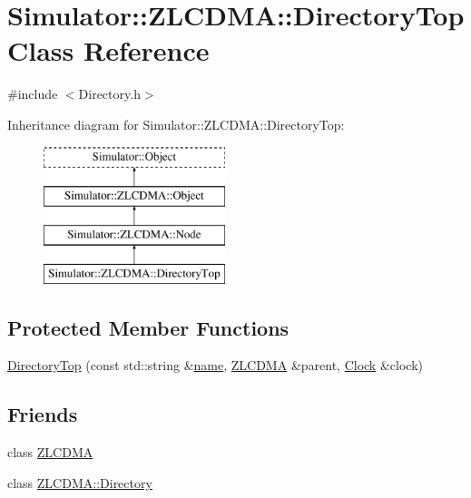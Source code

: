 \hypertarget{class_simulator_1_1_z_l_c_d_m_a_1_1_directory_top}{\section{Simulator\+:\+:Z\+L\+C\+D\+M\+A\+:\+:Directory\+Top Class Reference}
\label{class_simulator_1_1_z_l_c_d_m_a_1_1_directory_top}
}


{\ttfamily \#include $<$Directory.\+h$>$}

Inheritance diagram for Simulator\+:\+:Z\+L\+C\+D\+M\+A\+:\+:Directory\+Top\+:\begin{figure}[H]
\begin{center}
\leavevmode
\includegraphics[height=4.000000cm]{class_simulator_1_1_z_l_c_d_m_a_1_1_directory_top}
\end{center}
\end{figure}
\subsection*{Protected Member Functions}
\begin{DoxyCompactItemize}
\item 
\hyperlink{class_simulator_1_1_z_l_c_d_m_a_1_1_directory_top_af8fdc000b2e75afce37ee92b3893063a}{Directory\+Top} (const std\+::string \&\hyperlink{mtconf_8c_a8f8f80d37794cde9472343e4487ba3eb}{name}, \hyperlink{class_simulator_1_1_z_l_c_d_m_a}{Z\+L\+C\+D\+M\+A} \&parent, \hyperlink{class_simulator_1_1_clock}{Clock} \&clock)
\end{DoxyCompactItemize}
\subsection*{Friends}
\begin{DoxyCompactItemize}
\item 
class \hyperlink{class_simulator_1_1_z_l_c_d_m_a_1_1_directory_top_a1c09861c9a70825235b5f80518d478a1}{Z\+L\+C\+D\+M\+A}
\item 
class \hyperlink{class_simulator_1_1_z_l_c_d_m_a_1_1_directory_top_a1c8d2b869e248d4ee4a7b637c7252d62}{Z\+L\+C\+D\+M\+A\+::\+Directory}
\end{DoxyCompactItemize}
